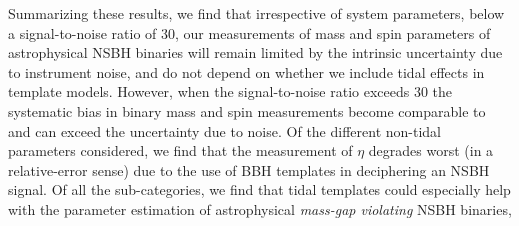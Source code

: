 \documentclass[aps,prd,amsmath,floats,floatfix, twocolumn,
superscriptaddress,nofootinbib,showpacs]{revtex4-1}
\begin{document}
Summarizing these results, we find that irrespective of system parameters,
below a signal-to-noise ratio of $30$, our measurements of mass and spin
parameters of astrophysical NSBH binaries will remain limited by the intrinsic
uncertainty due to instrument noise, and do not depend on whether we include
tidal effects in template models. However, when the signal-to-noise ratio
exceeds $30$ the systematic bias in binary mass and spin measurements become
comparable to and can exceed the uncertainty due to noise. Of the different
non-tidal parameters considered, we find that the measurement of $\eta$
degrades worst (in a relative-error sense) due to the use of BBH templates in
deciphering an NSBH signal. Of all the sub-categories, we find that tidal
templates could especially help with the parameter estimation of astrophysical
{\it mass-gap violating} NSBH binaries,







\end{document}
